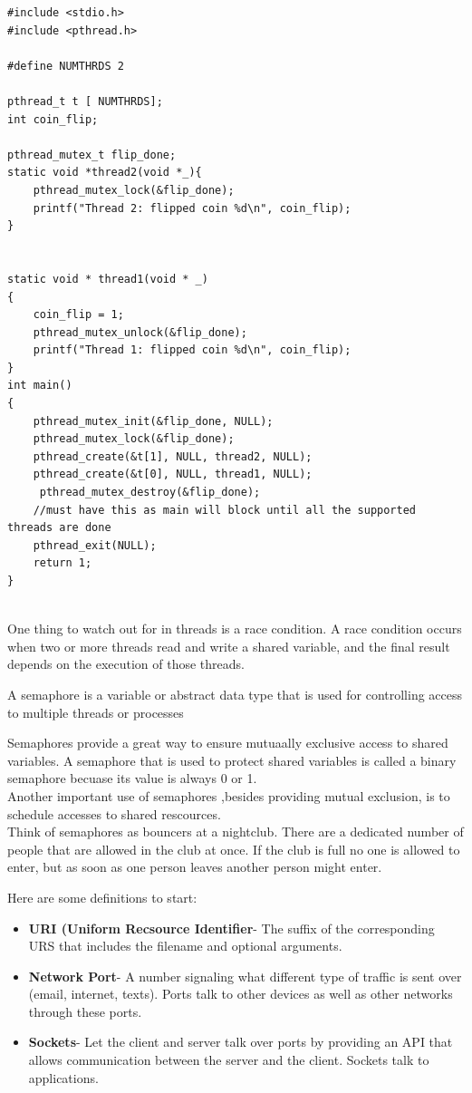 \documentclass[15pt,idxtotoc,hyperref,openany]{labbook} %
\begin{document}
\begin{lstlisting}
#include <stdio.h>
#include <pthread.h>

#define NUMTHRDS 2

pthread_t t [ NUMTHRDS];
int coin_flip;

pthread_mutex_t flip_done;
static void *thread2(void *_){
	pthread_mutex_lock(&flip_done);
	printf("Thread 2: flipped coin %d\n", coin_flip);
}


static void * thread1(void * _)
{
	coin_flip = 1;
	pthread_mutex_unlock(&flip_done);
	printf("Thread 1: flipped coin %d\n", coin_flip);
}
int main()
{
	pthread_mutex_init(&flip_done, NULL);
	pthread_mutex_lock(&flip_done);
	pthread_create(&t[1], NULL, thread2, NULL);
	pthread_create(&t[0], NULL, thread1, NULL);
	 pthread_mutex_destroy(&flip_done);
	//must have this as main will block until all the supported threads are done
	pthread_exit(NULL);
	return 1;
}


\end{lstlisting}


One thing to watch out for in threads is a race condition.  A race condition occurs when two or more threads read and write a shared variable, and the final result depends on the execution of those threads.

A semaphore is a variable or abstract data type that is used for controlling access to multiple threads or processes

Semaphores provide a great way to ensure mutuaally exclusive access to shared variables.  A semaphore that is used to protect shared variables is called a binary semaphore becuase its value is always 0 or 1.\\

Another important use of semaphores ,besides providing mutual exclusion, is to schedule accesses to shared rescources.\\

Think of semaphores as bouncers at a nightclub. There are a dedicated number of people that are allowed in the club at once. If the club is full no one is allowed to enter, but as soon as one person leaves another person might enter.








Here are some definitions to start:
\begin{itemize}
\item {\bf URI (Uniform Recsource Identifier}- The suffix of the corresponding URS that includes the filename and optional arguments.
\item {\bf Network Port}- A number signaling what different type of traffic is sent over (email, internet, texts).  Ports talk to other devices as well as other networks through these ports.  
\item {\bf Sockets}- Let the client and server talk over ports by providing an API that allows communication between the server and the client.  Sockets talk to applications.
\end{itemize}
\end{document}
